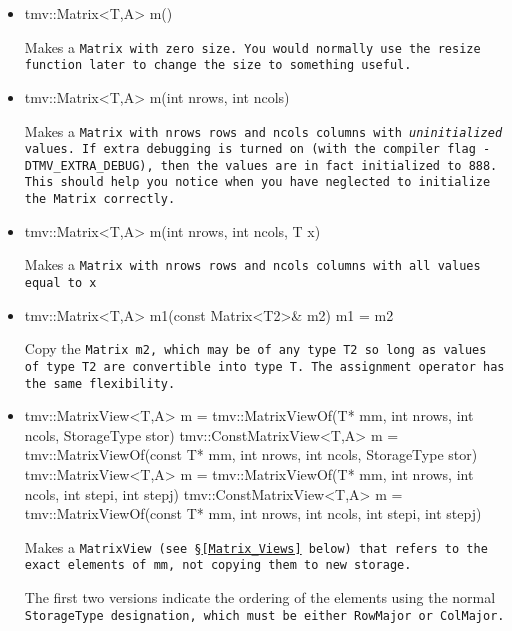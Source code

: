 \begin{itemize}

\item
\begin{tmvcode}
tmv::Matrix<T,A> m()
\end{tmvcode}
Makes a \tt{Matrix} with zero size.  You would normally use the \tt{resize} function later to
change the size to something useful.

\item 
\begin{tmvcode}
tmv::Matrix<T,A> m(int nrows, int ncols)
\end{tmvcode}
Makes a \tt{Matrix} with \tt{nrows} rows and \tt{ncols} columns with 
{\em uninitialized} values.
If extra debugging is turned on (with the compiler flag \tt{-DTMV\_EXTRA\_DEBUG}), then the values are in fact initialized to 888.  This should help you notice when you have neglected to initialize the \tt{Matrix} correctly.

\item
\begin{tmvcode}
tmv::Matrix<T,A> m(int nrows, int ncols, T x)
\end{tmvcode}
Makes a \tt{Matrix} with \tt{nrows} rows and \tt{ncols} columns with all 
values equal to \tt{x}

\item
\begin{tmvcode}
tmv::Matrix<T,A> m1(const Matrix<T2>& m2)
m1 = m2
\end{tmvcode}
Copy the \tt{Matrix m2}, which may be of any type \tt{T2} so long
as values of type \tt{T2} are convertible into type \tt{T}.
The assignment operator has the same flexibility.

\item
\begin{tmvcode}
tmv::MatrixView<T,A> m = 
      tmv::MatrixViewOf(T* mm, int nrows, int ncols, 
      StorageType stor)
tmv::ConstMatrixView<T,A> m = 
      tmv::MatrixViewOf(const T* mm, int nrows, int ncols, 
      StorageType stor)
tmv::MatrixView<T,A> m = 
      tmv::MatrixViewOf(T* mm, int nrows, int ncols, 
      int stepi, int stepj)
tmv::ConstMatrixView<T,A> m = 
      tmv::MatrixViewOf(const T* mm, int nrows, int ncols, 
      int stepi, int stepj)
\end{tmvcode}
Makes a \tt{MatrixView} (see \S\ref{Matrix_Views} below) that refers to the exact
elements of \tt{mm}, not copying them to new storage. 

The first two versions
indicate the ordering of the elements using the normal \tt{StorageType}
designation, which must be either \tt{RowMajor} or \tt{ColMajor}.
  

\end{itemize}
